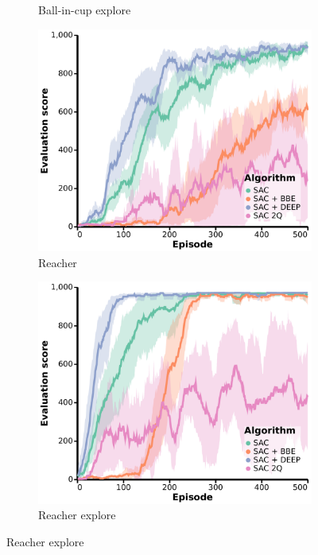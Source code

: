\begin{figure}[h]
\begin{subfigure}[b]{0.24\textwidth}
        \caption{Ball-in-cup explore}
    \end{subfigure}
    \hfill
    \begin{subfigure}[b]{0.24\textwidth}
        \centering
        \includegraphics[width=\textwidth]{figures/deep/neurips_SAC2Q_reacher.pdf}
        \caption{Reacher}
    \end{subfigure}
    \begin{subfigure}[b]{0.24\textwidth}
        \centering
        \includegraphics[width=\textwidth]{figures/deep/neurips_SAC2Q_reacher_explore.pdf}
        \caption{Reacher explore}
    \end{subfigure}
    \vspace{1em}


\end{figure}
